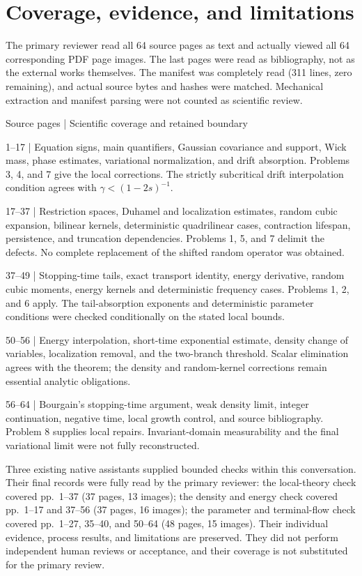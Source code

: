 \documentclass[10pt]{article}
\begin{document}
\section*{Coverage, evidence, and limitations}
The primary reviewer read all 64 source pages as text and actually viewed all 64 corresponding PDF page images. The last pages were read as bibliography, not as the external works themselves. The manifest was completely read (311 lines, zero remaining), and actual source bytes and hashes were matched. Mechanical extraction and manifest parsing were not counted as scientific review.\par
Source pages | Scientific coverage and retained boundary\par
1–17 | Equation signs, main quantifiers, Gaussian covariance and support, Wick mass, phase estimates, variational normalization, and drift absorption. Problems 3, 4, and 7 give the local corrections. The strictly subcritical drift interpolation condition agrees with \(\gamma<(1-2s)^{-1}\).\par
17–37 | Restriction spaces, Duhamel and localization estimates, random cubic expansion, bilinear kernels, deterministic quadrilinear cases, contraction lifespan, persistence, and truncation dependencies. Problems 1, 5, and 7 delimit the defects. No complete replacement of the shifted random operator was obtained.\par
37–49 | Stopping-time tails, exact transport identity, energy derivative, random cubic moments, energy kernels and deterministic frequency cases. Problems 1, 2, and 6 apply. The tail-absorption exponents and deterministic parameter conditions were checked conditionally on the stated local bounds.\par
50–56 | Energy interpolation, short-time exponential estimate, density change of variables, localization removal, and the two-branch threshold. Scalar elimination agrees with the theorem; the density and random-kernel corrections remain essential analytic obligations.\par
56–64 | Bourgain’s stopping-time argument, weak density limit, integer continuation, negative time, local growth control, and source bibliography. Problem 8 supplies local repairs. Invariant-domain measurability and the final variational limit were not fully reconstructed.\par
Three existing native assistants supplied bounded checks within this conversation. Their final records were fully read by the primary reviewer: the local-theory check covered pp. 1–37 (37 pages, 13 images); the density and energy check covered pp. 1–17 and 37–56 (37 pages, 16 images); the parameter and terminal-flow check covered pp. 1–27, 35–40, and 50–64 (48 pages, 15 images). Their individual evidence, process results, and limitations are preserved. They did not perform independent human reviews or acceptance, and their coverage is not substituted for the primary review.\par
\end{document}
